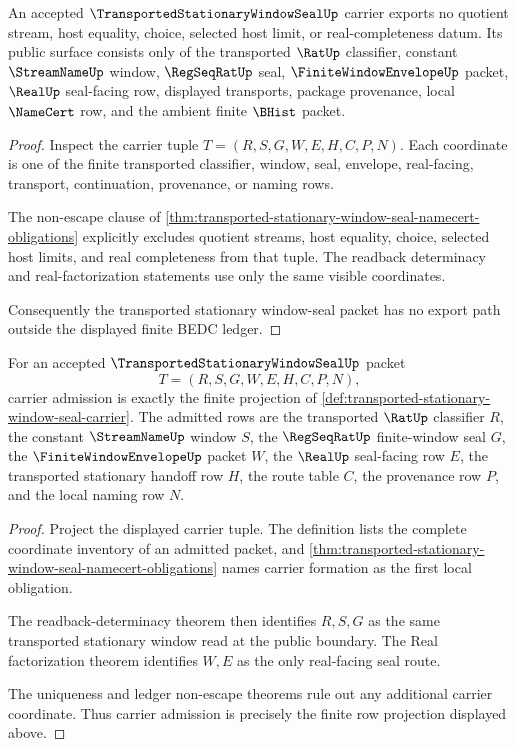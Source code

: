 \begin{theorem}
\label{thm:transported-stationary-window-seal-ledger-nonescape}
An accepted $\TransportedStationaryWindowSealUp$ carrier exports no quotient stream, host equality, choice, selected host limit, or real-completeness datum. Its public surface consists only of the transported $\RatUp$ classifier, constant $\StreamNameUp$ window, $\RegSeqRatUp$ seal, $\FiniteWindowEnvelopeUp$ packet, $\RealUp$ seal-facing row, displayed transports, package provenance, local $\NameCert$ row, and the ambient finite $\BHist$ packet.
\end{theorem}
\begin{proof}
Inspect the carrier tuple $T=(R,S,G,W,E,H,C,P,N)$. Each coordinate is one of the finite transported classifier, window, seal, envelope, real-facing, transport, continuation, provenance, or naming rows.

The non-escape clause of \autoref{thm:transported-stationary-window-seal-namecert-obligations} explicitly excludes quotient streams, host equality, choice, selected host limits, and real completeness from that tuple. The readback determinacy and real-factorization statements use only the same visible coordinates.

Consequently the transported stationary window-seal packet has no export path outside the displayed finite BEDC ledger.
\end{proof}

\begin{theorem}
\label{thm:transported-stationary-window-seal-carrier-obligation}
For an accepted $\TransportedStationaryWindowSealUp$ packet
$$
T=(R,S,G,W,E,H,C,P,N),
$$
carrier admission is exactly the finite projection of \autoref{def:transported-stationary-window-seal-carrier}. The admitted rows are the transported $\RatUp$ classifier $R$, the constant $\StreamNameUp$ window $S$, the $\RegSeqRatUp$ finite-window seal $G$, the $\FiniteWindowEnvelopeUp$ packet $W$, the $\RealUp$ seal-facing row $E$, the transported stationary handoff row $H$, the route table $C$, the provenance row $P$, and the local naming row $N$.
\end{theorem}
\begin{proof}
Project the displayed carrier tuple. The definition lists the complete coordinate inventory of an admitted packet, and \autoref{thm:transported-stationary-window-seal-namecert-obligations} names carrier formation as the first local obligation.

The readback-determinacy theorem then identifies $R,S,G$ as the same transported stationary window read at the public boundary. The Real factorization theorem identifies $W,E$ as the only real-facing seal route.

The uniqueness and ledger non-escape theorems rule out any additional carrier coordinate. Thus carrier admission is precisely the finite row projection displayed above.
\end{proof}

